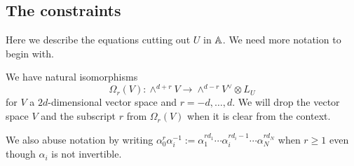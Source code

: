 \documentclass{amsart}
\theoremstyle{definition}
\begin{document}
\subsection{The constraints}
Here we describe the equations cutting out $U$ in $\mathbb{A}$.
We need more notation to begin with.

\begin{notation}
We have natural isomorphisms
$$\Omega_r(V) \colon \wedge^{d+r} V \rightarrow \wedge^{d-r} V^\vee \otimes L_U$$ for $V$ a $2d$-dimensional vector space and $r= -d, \ldots, d$.
We will drop the vector space $V$ and the subscript $r$ from $\Omega_r(V)$ when it is clear from the context.

We also abuse notation by writing $\alpha_0^r \alpha_i^{-1} := \alpha_1^{rd_1} \cdots \alpha_i^{rd_i-1} \cdots \alpha_N^{rd_N}$ when $r\geq 1$ even though $\alpha_i$ is not invertible.
\end{notation}
\end{document}
